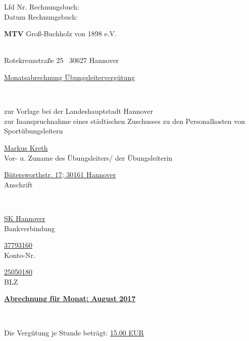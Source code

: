 \documentclass[a4paper,10pt,BCOR=0mm]{scrreprt}
\begin{document}
\begin{flushright}
\parbox{6cm}{Lfd Nr. Rechnungsbuch: \hrulefill \\
Datum Rechnungsbuch: \hrulefill }
\end{flushright}
\begin{center}
\begin{Large}\textbf{MTV} Groß-Buchholz von 1898 e.V.                                        \end{Large}\\
Rotekreuzstraße 25 \textperiodcentered\ 30627 Hannover\\[.4cm]
\begin{huge}\underline{Monatsabrechnung Übungsleitervergütung}\end{huge}\\
\begin{scriptsize}zur Vorlage bei der Landeshauptstadt Hannover\\
zur Inanspruchnahme eines städtischen Zuschusses zu den Personalkosten von Sportübungsleitern\\[.7cm]
\end{scriptsize}

\parbox{0,49\textwidth}{
\begin{center}
\hrulefill\underline{Markus Kreth}\hrulefill\\
Vor- u. Zuname des Übungsleiters/ der Übungsleiterin
\end{center}
}
\hfill
\parbox{0,49\textwidth}{\begin{center}
\hrulefill\underline{Bütersworthstr. 17; 30161 Hannover}\hrulefill\\
Anschrift\end{center}}\\[.7cm]
\parbox{0,32\textwidth}{
\begin{center}
\hrulefill\underline{SK Hannover}\hrulefill\\
Bankverbindung
\end{center}
}
\hfill
\parbox{0,32\textwidth}{
\begin{center}
\hrulefill\underline{37793160}\hrulefill\\
Konto-Nr.
\end{center}
}
\hfill
\parbox{0,32\textwidth}{
\begin{center}
\hrulefill\underline{25050180}\hrulefill\\
BLZ
\end{center}
}
\parbox{12cm}{\begin{large}\underline{\textbf{Abrechnung für Monat: August 2017}}\end{large}}\\
\parbox{9cm}{Die Vergütung je Stunde beträgt: \underline{15.00 EUR}}
\end{center}\begin{flushright}


\end{flushright}
\end{document}
